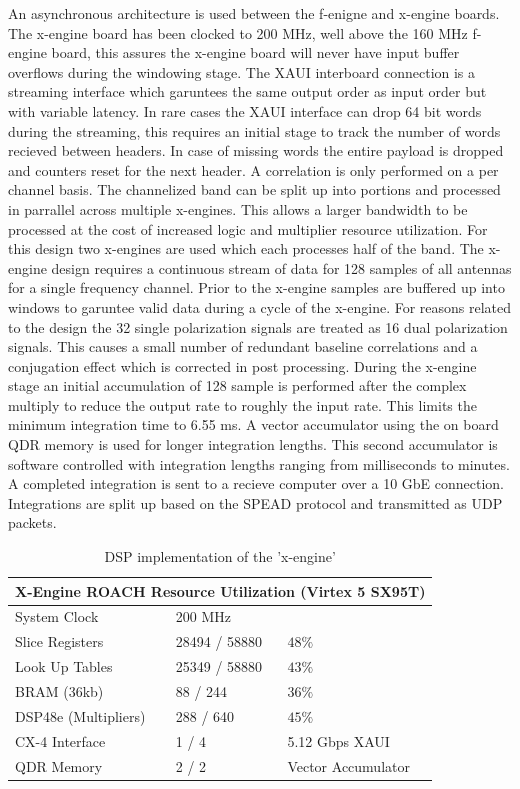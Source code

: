 \documentclass[useAMS,macros,usenatbib,onecolumn]{mn2e}
\begin{document}
An asynchronous architecture is used between the f-enigne and x-engine boards.
The x-engine board has been clocked to 200 MHz, well above the 160 MHz f-engine board, this assures the x-engine board will never have input buffer overflows during the windowing stage.
The XAUI interboard connection is a streaming interface which garuntees the same output order as input order but with variable latency.
In rare cases the XAUI interface can drop 64 bit words during the streaming, this requires an initial stage to track the number of words recieved between headers.
In case of missing words the entire payload is dropped and counters reset for the next header.
A correlation is only performed on a per channel basis.
The channelized band can be split up into portions and processed in parrallel across multiple x-engines.
This allows a larger bandwidth to be processed at the cost of increased logic and multiplier resource utilization.
For this design two x-engines are used which each processes half of the band.
The x-engine design requires a continuous stream of data for 128 samples of all antennas for a single frequency channel.
Prior to the x-engine samples are buffered up into windows to garuntee valid data during a cycle of the x-engine.
For reasons related to the design the 32 single polarization signals are treated as 16 dual polarization signals.
This causes a small number of redundant baseline correlations and a conjugation effect which is corrected in post processing.
During the x-engine stage an initial accumulation of 128 sample is performed after the complex multiply to reduce the output rate to roughly the input rate.
This limits the minimum integration time to 6.55 ms.
A vector accumulator using the on board QDR memory is used for longer integration lengths.
This second accumulator is software controlled with integration lengths ranging from milliseconds to minutes.
A completed integration is sent to a recieve computer over a 10 GbE connection.
Integrations are split up based on the SPEAD protocol\citep{} and transmitted as UDP packets.

\begin{table}
\begin{center}
\begin{tabular}{| l | l | l |}
\hline
\multicolumn{3}{|c|}{X-Engine ROACH Resource Utilization (Virtex 5 SX95T)}\\
\hline
System Clock & 200 MHz \\
Slice Registers & 28494 / 58880 & $48\%$\\
Look Up Tables & 25349 / 58880 & $43\%$\\
BRAM (36kb) & 88 / 244 & $36\%$\\
DSP48e (Multipliers) & 288 / 640 & $45\%$\\
CX-4 Interface & 1 / 4 & 5.12 Gbps XAUI\\
QDR Memory & 2 / 2 & Vector Accumulator\\
\hline
\end{tabular}
\caption{DSP implementation of the 'x-engine'}
\label{tbl:xeng_resource}
\end{center}
\end{table}
\end{document}
